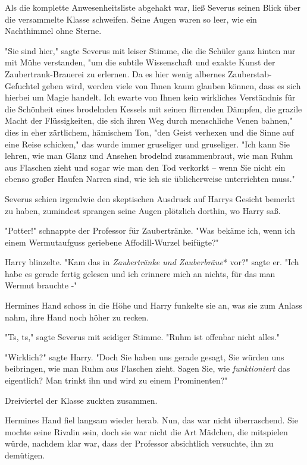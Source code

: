 {Als die komplette Anwesenheitsliste abgehakt war, ließ Severus seinen Blick über die versammelte Klasse schweifen. Seine Augen waren so leer, wie ein Nachthimmel ohne Sterne.

"Sie sind hier," sagte Severus mit leiser Stimme, die die Schüler ganz hinten nur mit Mühe verstanden, "um die subtile Wissenschaft und exakte Kunst der Zaubertrank-Brauerei zu erlernen. Da es hier wenig albernes Zauberstab-Gefuchtel geben wird, werden viele von Ihnen kaum glauben können, dass es sich hierbei um Magie handelt. Ich ewarte von Ihnen kein wirkliches Verständnis für die Schönheit eines brodelnden Kessels mit seinen flirrenden Dämpfen, die grazile Macht der Flüssigkeiten, die sich ihren Weg durch menschliche Venen bahnen," dies in eher zärtlichem, hämischem Ton, "den Geist verhexen und die Sinne auf eine Reise schicken," das wurde immer gruseliger und gruseliger. "Ich kann Sie lehren, wie man Glanz und Ansehen brodelnd zusammenbraut, wie man Ruhm aus Flaschen zieht und sogar wie man den Tod verkorkt -- wenn Sie nicht ein ebenso großer Haufen Narren sind, wie ich sie üblicherweise unterrichten muss."

Severus schien irgendwie den skeptischen Ausdruck auf Harrys Gesicht bemerkt zu haben, zumindest sprangen seine Augen plötzlich dorthin, wo Harry saß.

"Potter!" schnappte der Professor für Zaubertränke. "Was bekäme ich, wenn ich einem Wermutaufguss geriebene Affodill-Wurzel beifügte?"

Harry blinzelte. "Kam das in \emph{Zaubertränke und Zauberbräue}* vor?" sagte er. "Ich habe es gerade fertig gelesen und ich erinnere mich an nichts, für das man Wermut brauchte -"

Hermines Hand schoss in die Höhe und Harry funkelte sie an, was sie zum Anlass nahm, ihre Hand noch höher zu recken.

"Ts, ts," sagte Severus mit seidiger Stimme. "Ruhm ist offenbar nicht alles."

"Wirklich?" sagte Harry. "Doch Sie haben uns gerade gesagt, Sie würden uns beibringen, wie man Ruhm aus Flaschen zieht. Sagen Sie, wie \emph{funktioniert} das eigentlich? Man trinkt ihn und wird zu einem Prominenten?"

Dreiviertel der Klasse zuckten zusammen.

Hermines Hand fiel langsam wieder herab. Nun, das war nicht überraschend. Sie mochte seine Rivalin sein, doch sie war nicht die Art Mädchen, die mitspielen würde, nachdem klar war, dass der Professor absichtlich versuchte, ihn zu demütigen.

}
